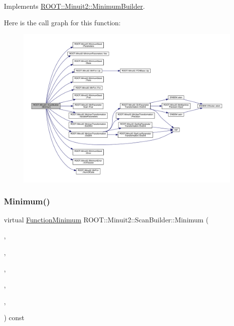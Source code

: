 Implements \mbox{\hyperlink{classROOT_1_1Minuit2_1_1MinimumBuilder_aefaa624436afa8195af1f3393a35981f}{R\+O\+O\+T\+::\+Minuit2\+::\+Minimum\+Builder}}.

Here is the call graph for this function\+:\nopagebreak
\begin{figure}[H]
\begin{center}
\leavevmode
\includegraphics[width=350pt]{d1/d35/classROOT_1_1Minuit2_1_1ScanBuilder_ad53e9711dc8a63958845ac6e6eb5250f_cgraph}
\end{center}
\end{figure}
\mbox{\label{classROOT_1_1Minuit2_1_1ScanBuilder_a24547691823b9f0977e6b23b6d084e7a}} 
\subsubsection{\texorpdfstring{Minimum()}{Minimum()}\hspace{0.1cm}{\footnotesize\ttfamily [2/2]}}
{\footnotesize\ttfamily virtual \mbox{\hyperlink{classROOT_1_1Minuit2_1_1FunctionMinimum}{Function\+Minimum}} R\+O\+O\+T\+::\+Minuit2\+::\+Scan\+Builder\+::\+Minimum (\begin{DoxyParamCaption}\item[{const \mbox{\hyperlink{classROOT_1_1Minuit2_1_1MnFcn}{Mn\+Fcn}} \&}]{,  }\item[{const \mbox{\hyperlink{classROOT_1_1Minuit2_1_1GradientCalculator}{Gradient\+Calculator}} \&}]{,  }\item[{const \mbox{\hyperlink{classROOT_1_1Minuit2_1_1MinimumSeed}{Minimum\+Seed}} \&}]{,  }\item[{const \mbox{\hyperlink{classROOT_1_1Minuit2_1_1MnStrategy}{Mn\+Strategy}} \&}]{,  }\item[{unsigned int}]{,  }\item[{double}]{ }\end{DoxyParamCaption}) const\hspace{0.3cm}{\ttfamily [virtual]}}



